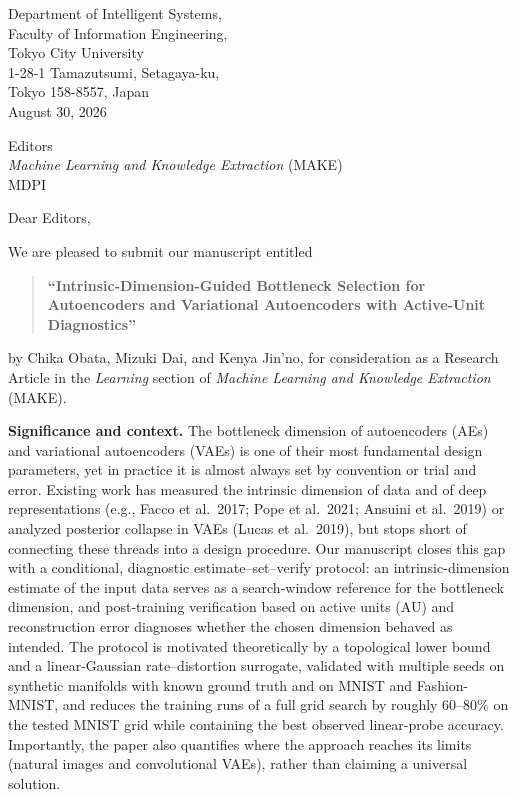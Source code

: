 \documentclass[10pt,a4paper]{article}
\begin{document}
\begin{flushright}
Department of Intelligent Systems,\\
Faculty of Information Engineering,\\
Tokyo City University\\
1-28-1 Tamazutsumi, Setagaya-ku,\\
Tokyo 158-8557, Japan\\[4pt]
August 30, 2026
\end{flushright}

\noindent
Editors\\
\textit{Machine Learning and Knowledge Extraction} (MAKE)\\
MDPI

\vspace{1.5em}

\noindent
Dear Editors,

We are pleased to submit our manuscript entitled
\begin{quote}
\textbf{``Intrinsic-Dimension-Guided Bottleneck Selection for Autoencoders
and Variational Autoencoders with Active-Unit Diagnostics''}
\end{quote}
by Chika Obata, Mizuki Dai, and Kenya Jin'no, for consideration as a
Research Article in the \emph{Learning} section of \textit{Machine Learning
and Knowledge Extraction} (MAKE).

\textbf{Significance and context.}
The bottleneck dimension of autoencoders (AEs) and variational autoencoders
(VAEs) is one of their most fundamental design parameters, yet in practice
it is almost always set by convention or trial and error. Existing work has
measured the intrinsic dimension of data and of deep representations (e.g.,
Facco et al.\ 2017; Pope et al.\ 2021; Ansuini et al.\ 2019) or analyzed
posterior collapse in VAEs (Lucas et al.\ 2019), but stops short of
connecting these threads into a design procedure. Our manuscript closes
this gap with a conditional, diagnostic estimate--set--verify protocol: an
intrinsic-dimension estimate of the input data serves as a search-window
reference for the bottleneck dimension, and post-training verification
based on active units (AU) and reconstruction error diagnoses whether the
chosen dimension behaved as intended. The protocol is motivated
theoretically by a topological lower bound and a linear-Gaussian
rate--distortion surrogate, validated with multiple seeds on synthetic
manifolds with known ground truth and on MNIST and Fashion-MNIST, and
reduces the training runs of a full grid search by roughly 60--80\% on the
tested MNIST grid while containing the best observed linear-probe accuracy.
Importantly, the paper also quantifies where the approach reaches its
limits (natural images and convolutional VAEs), rather than claiming a
universal solution.
\end{document}
